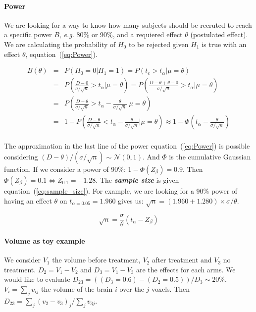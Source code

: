 \documentclass[final, paper=letter,5p,times,twocolumn]{elsarticle}
\theoremstyle{definition}
\begin{document}
\paragraph{Power}{We are looking for a way to know how many subjects should be recruted to reach a specific power $B$, {\it e.g.} 80\% or 90\%, and a requiered effect $\theta$ (postulated effect). We are calculating the probability of $H_{0}$ to be rejected given $H_{1}$ is true with an effect $\theta$, equation~(\ref{eq:Power}). 

  \begin{equation}
    \begin{array}{rcl}
      B(\theta) & = & P\left( H_{0} = 0 | H_{1} = 1 \right)  = P\left( t_{e} > t_{\alpha} | \mu = \theta \right) \\
      & = & P\left( \frac{D - 0}{\sigma / \sqrt{n}} > t_{\alpha} | \mu = \theta \right) = P\left( \frac{D - \theta + \theta - 0}{\sigma / \sqrt{n}} > t_{\alpha} | \mu = \theta \right) \\
      & = & P\left( \frac{D - \theta}{\sigma / \sqrt{n}} > t_{\alpha} - \frac{\theta}{\sigma / \sqrt{n}} | \mu = \theta \right) \\
      & = & 1 - P\left( \frac{D - \theta}{\sigma / \sqrt{n}} < t_{\alpha} - \frac{\theta}{\sigma / \sqrt{n}} | \mu = \theta \right) \approx 1 - \Phi \left( t_{\alpha} - \frac{\theta}{\sigma / \sqrt{n}} \right)\\
    \end{array}
    \label{eq:Power}
  \end{equation}

  The approximation in the last line of the power equation~(\ref{eq:Power}) is possible considering $(D - \theta) / (\sigma / \sqrt{n}) \sim \mathcal{N}(0,1)$. And $\Phi$ is the cumulative Gaussian function. If we consider a power of 90\%: $1 - \Phi(Z_{\beta}) = 0.9$. Then $\Phi(Z_{\beta}) = 0.1 \Leftrightarrow Z_{0.1} = -1.28$. The {\bf \it sample size} is given equation~(\ref{eq:sample_size}). For example, we are looking for a 90\% power of having an effect $\theta$ on $t_{\alpha = 0.05} = 1.960$ gives us: $\sqrt{n} = (1.960+1.280) \times \sigma / \theta$.

  \begin{equation}
    \sqrt{n} = \frac{\sigma}{\theta} (t_{\alpha} - Z_{\beta})
    \label{eq:sample_size}
  \end{equation}
}

\paragraph{Volume as toy example}{We consider $V_{1}$ the volume before treatment, $V_{2}$ after treatment and $V_{3}$ no treatment. $D_{2} = V_{1} - V_{2}$ and $D_{3} = V_{1} - V_{3}$ are the effects for each arms. We would like to evaluate $D_{23} = ((D_{3} = 0.6) - (D_{2} = 0.5)) / D_{3} \sim 20\%$. $V_{i} = \sum_{j} v_{ij}$ the volume of the brain $i$ over the $j$ voxels. Then $D_{23} = \sum_{j} (v_{2} - v_{3})_{j} / \sum_{j}v_{3j}$.}
\end{document}
